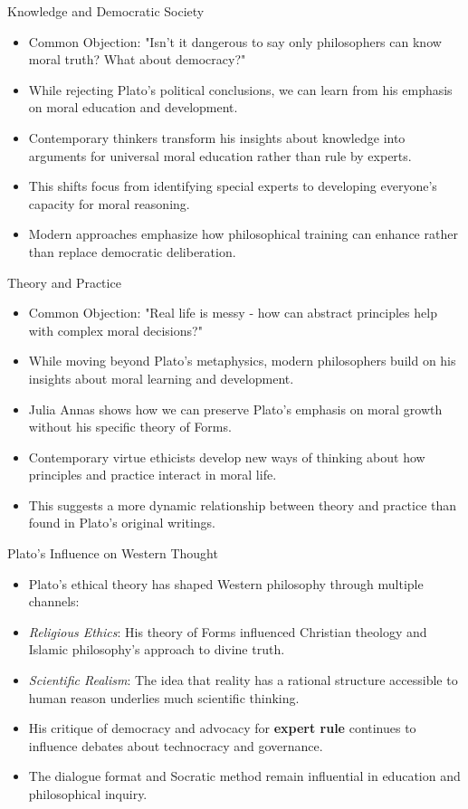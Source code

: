 \documentclass[aspectratio=169]{beamer}
\begin{document}
\begin{frame}{Knowledge and Democratic Society}
    \begin{itemize}
    \item Common Objection: "Isn't it dangerous to say only philosophers can know moral truth? What about democracy?"
    \item While rejecting Plato's political conclusions, we can learn from his emphasis on moral education and development.
    \item Contemporary thinkers transform his insights about knowledge into arguments for universal moral education rather than rule by experts.
    \item This shifts focus from identifying special experts to developing everyone's capacity for moral reasoning.
    \item Modern approaches emphasize how philosophical training can enhance rather than replace democratic deliberation.
    \end{itemize}
\end{frame}

\begin{frame}{Theory and Practice}
    \begin{itemize}
    \item Common Objection: "Real life is messy - how can abstract principles help with complex moral decisions?"
    \item While moving beyond Plato's metaphysics, modern philosophers build on his insights about moral learning and development.
    \item Julia Annas shows how we can preserve Plato's emphasis on moral growth without his specific theory of Forms.
    \item Contemporary virtue ethicists develop new ways of thinking about how principles and practice interact in moral life.
    \item This suggests a more dynamic relationship between theory and practice than found in Plato's original writings.
    \end{itemize}
\end{frame}

\begin{frame}{Plato's Influence on Western Thought}
\begin{itemize}
\item Plato's ethical theory has shaped Western philosophy through multiple channels:
\item \emph{Religious Ethics}: His theory of Forms influenced Christian theology and Islamic philosophy's approach to divine truth.
\item \emph{Scientific Realism}: The idea that reality has a rational structure accessible to human reason underlies much scientific thinking.
\item His critique of democracy and advocacy for \textbf{expert rule} continues to influence debates about technocracy and governance.
\item The dialogue format and Socratic method remain influential in education and philosophical inquiry.
\end{itemize}
\end{frame}
\end{document}
